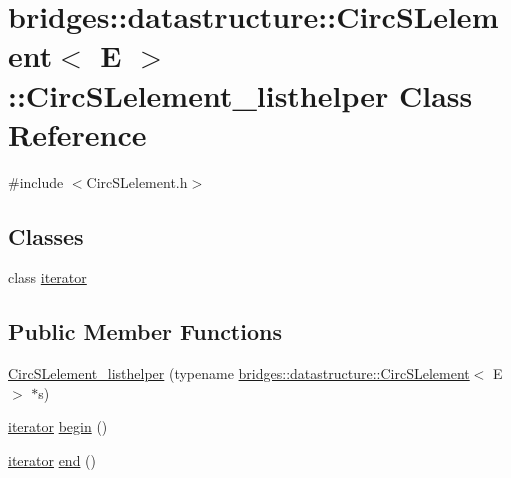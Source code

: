 \hypertarget{classbridges_1_1datastructure_1_1_circ_s_lelement_1_1_circ_s_lelement__listhelper}{}\section{bridges\+:\+:datastructure\+:\+:Circ\+S\+Lelement$<$ E $>$\+:\+:Circ\+S\+Lelement\+\_\+listhelper Class Reference}
\label{classbridges_1_1datastructure_1_1_circ_s_lelement_1_1_circ_s_lelement__listhelper}


{\ttfamily \#include $<$Circ\+S\+Lelement.\+h$>$}

\subsection*{Classes}
\begin{DoxyCompactItemize}
\item 
class \hyperlink{classbridges_1_1datastructure_1_1_circ_s_lelement_1_1_circ_s_lelement__listhelper_1_1iterator}{iterator}
\end{DoxyCompactItemize}
\subsection*{Public Member Functions}
\begin{DoxyCompactItemize}
\item 
\hyperlink{classbridges_1_1datastructure_1_1_circ_s_lelement_1_1_circ_s_lelement__listhelper_acbdfc2d3415b54a52bb3b5e7b4bc9929}{Circ\+S\+Lelement\+\_\+listhelper} (typename \hyperlink{classbridges_1_1datastructure_1_1_circ_s_lelement}{bridges\+::datastructure\+::\+Circ\+S\+Lelement}$<$ E $>$ $\ast$s)
\item 
\hyperlink{classbridges_1_1datastructure_1_1_circ_s_lelement_1_1_circ_s_lelement__listhelper_1_1iterator}{iterator} \hyperlink{classbridges_1_1datastructure_1_1_circ_s_lelement_1_1_circ_s_lelement__listhelper_aa1294a519be56c74beec21d2c4a13864}{begin} ()
\item 
\hyperlink{classbridges_1_1datastructure_1_1_circ_s_lelement_1_1_circ_s_lelement__listhelper_1_1iterator}{iterator} \hyperlink{classbridges_1_1datastructure_1_1_circ_s_lelement_1_1_circ_s_lelement__listhelper_aceac5cae38d478dd16d2e44f329ea821}{end} ()
\end{DoxyCompactItemize}


